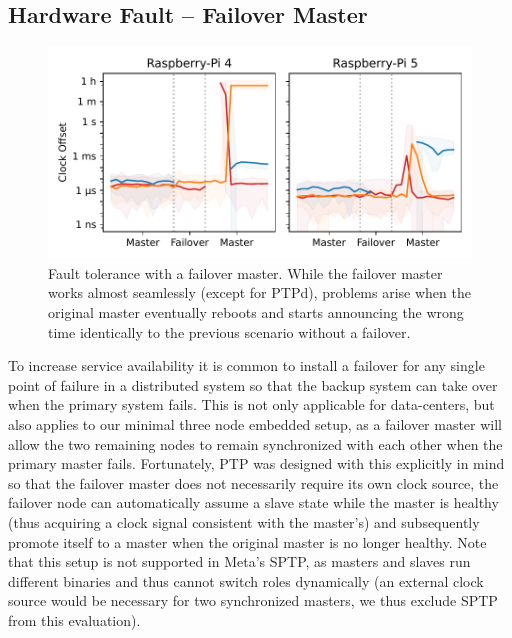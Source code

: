 \subsection{Hardware Fault -- Failover Master}

\begin{figure}
    \includegraphics[width=\linewidth]{res/generated/fault/hardware/master_failover_cluster_comparison.pdf}
    \caption{Fault tolerance with a failover master. While the failover master works almost seamlessly (except for PTPd), problems arise when the original master eventually reboots and starts announcing the wrong time identically to the previous scenario without a failover.}
    \label{fig:failover}
\end{figure}

To increase service availability it is common to install a failover for any single point of failure in a distributed system so that the backup system can take over when the primary system fails. This is not only applicable for data-centers, but also applies to our minimal three node embedded setup, as a failover master will allow the two remaining nodes to remain synchronized with each other when the primary master fails. Fortunately, PTP was designed with this explicitly in mind so that the failover master does not necessarily require its own clock source, the failover node can automatically assume a slave state while the master is healthy (thus acquiring a clock signal consistent with the master's) and subsequently promote itself to a master when the original master is no longer healthy. Note that this setup is not supported in Meta's SPTP, as masters and slaves run different binaries and thus cannot switch roles dynamically (an external clock source would be necessary for two synchronized masters, we thus exclude SPTP from this evaluation).

